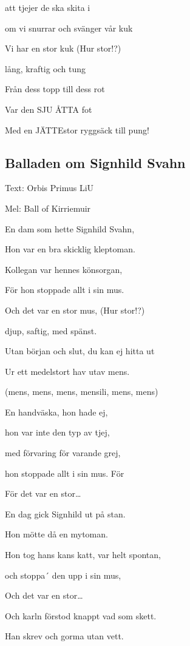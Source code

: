 att tjejer de ska skita i

om vi snurrar och svänger vår kuk\bigskip



Vi har en stor kuk (Hur stor!?)

lång, kraftig och tung

Från dess topp till dess rot

Var den SJU ÅTTA fot

Med en JÄTTEstor ryggsäck till pung!

\subsection{\textbf{Balladen om Signhild Svahn}}

Text: Orbis Primus LiU

Mel: Ball of Kirriemuir\bigskip

En dam som hette Signhild Svahn,

Hon var en bra skicklig kleptoman.

Kollegan var hennes könsorgan,

För hon stoppade allt i sin mus. \bigskip



Och det var en stor mus, (Hur stor!?)

djup, saftig, med spänst.

Utan början och slut, du kan ej hitta ut

Ur ett medelstort hav utav mens.\bigskip

(mens, mens, mens, mensili, mens, mens)\bigskip



En handväska, hon hade ej,

hon var inte den typ av tjej,

med förvaring för varande grej,

hon stoppade allt i sin mus. För\bigskip


För det var en stor…\bigskip


En dag gick Signhild ut på stan.

Hon mötte då en mytoman.

Hon tog hans kans katt, var helt spontan,

och stoppa´ den upp i sin mus,

Och det var en stor…\bigskip



Och karln förstod knappt vad som skett.

Han skrev och gorma utan vett.

